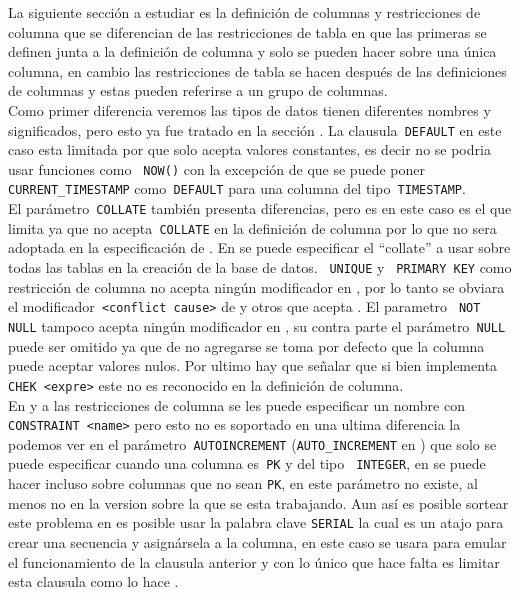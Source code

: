 La siguiente sección a estudiar es la definición de columnas y restricciones de columna que se diferencian de las restricciones de tabla en que las primeras se definen junta a la definición de columna y solo se pueden hacer sobre una única columna, en cambio las restricciones de tabla se hacen después de las definiciones de columnas y estas pueden referirse a un grupo de columnas.\\

Como primer diferencia veremos las tipos de datos tienen diferentes nombres y significados, pero esto ya fue tratado en la sección . La clausula\verb= DEFAULT= en este caso esta limitada por \m que solo acepta valores constantes, es decir no se podria usar funciones como \verb= NOW()= con la excepción de que se puede poner\verb= CURRENT_TIMESTAMP= como\verb= DEFAULT= para una columna del tipo\verb= TIMESTAMP=.\\

El parámetro\verb= COLLATE= también presenta diferencias, pero es en este caso es \p el que limita ya que no acepta\verb= COLLATE= en la definición de columna por lo que no sera adoptada en la especificación de \jj. En \p se puede especificar el ``collate'' a usar sobre todas las tablas en la creación de la base de datos. \verb= UNIQUE= y \verb= PRIMARY KEY= como restricción de columna no acepta ningún modificador en \m, por lo tanto se obviara el modificador\verb= <conflict cause>= de \s y otros que acepta \p. El parametro \verb= NOT NULL= tampoco acepta ningún modificador en \m, su contra parte el parámetro\verb= NULL= puede ser omitido ya que de no agregarse se toma por defecto que la columna puede aceptar valores nulos. Por ultimo hay que señalar que \m si bien implementa\verb= CHEK <expre>= este no es reconocido en la definición de columna.\\

En \s y \p a las restricciones de columna se les puede especificar un nombre con \verb=CONSTRAINT <name>= pero esto no es soportado en \m una ultima diferencia la podemos ver en el parámetro\verb= AUTOINCREMENT= (\verb=AUTO_INCREMENT= en \m) que solo se puede especificar cuando una columna es\verb= PK= y del tipo \verb= INTEGER=, en \m se puede hacer incluso sobre columnas que no sean \verb=PK=, en \p este parámetro no existe, al menos no en la version  sobre la que se esta trabajando. Aun así es posible sortear este problema en \p es posible usar la palabra clave \verb=SERIAL= la cual es un atajo para crear una secuencia y asignársela a la columna, en este caso se usara para emular el funcionamiento de la clausula anterior y con \m lo único que hace falta es limitar esta clausula como lo hace \s.   

